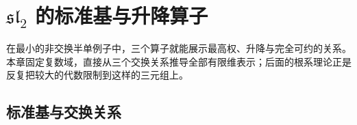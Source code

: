 
\section{\texorpdfstring{\(\mathfrak{sl}_2\)}{sl₂} 的标准基与升降算子}
\label{b5:sec:1401}


%
%

在最小的非交换半单例子中，三个算子就能展示最高权、升降与完全可约的关系。本章固定复数域，直接从三个交换关系推导全部有限维表示；后面的根系理论正是反复把较大的代数限制到这样的三元组上。

\subsection{标准基与交换关系}
\label{b5:subsec:1401:01}

